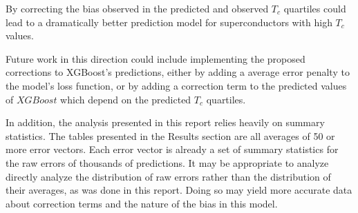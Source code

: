 \documentclass[oneside,12pt]{amsart}
\begin{document}
 By correcting the bias observed in the predicted and observed $T_c$ quartiles could lead to a dramatically better prediction model for superconductors with high $T_c$ values. 
 
 Future work in this direction could include implementing the proposed corrections to XGBoost's predictions, either by adding a average error penalty to the model's loss function, or by adding a correction term to the predicted values of $XGBoost$ which depend on the predicted $T_c$ quartiles.
 
 In addition, the analysis presented in this report relies heavily on summary statistics. The tables presented in the Results section are all averages of 50 or more error vectors. Each error vector is already a set of summary statistics for the raw errors of thousands of predictions. It may be appropriate to analyze directly analyze the distribution of raw errors rather than the distribution of their averages, as was done in this report. Doing so may yield more accurate data about correction terms and the nature of the bias in this model.
 \newpage
\printbibliography
\end{document}
